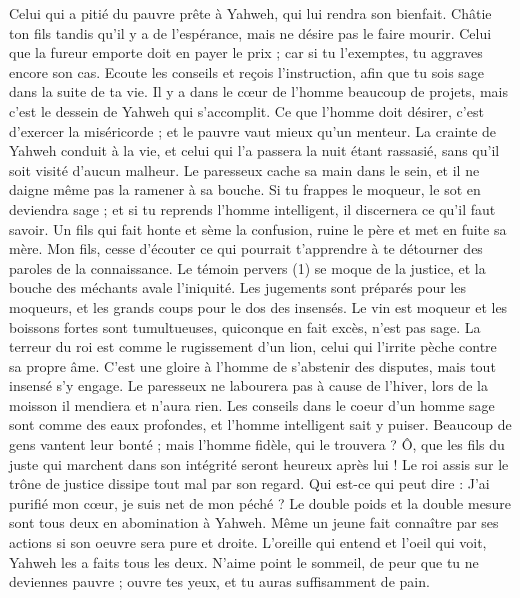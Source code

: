 \begin{multicols}{2}
Celui qui a pitié du pauvre prête à Yahweh, qui lui rendra son bienfait.
Châtie ton fils tandis qu'il y a de l'espérance, mais ne désire pas le faire mourir.
Celui que la fureur emporte doit en payer le prix ; car si tu l'exemptes, tu aggraves encore son cas.
Ecoute les conseils et reçois l'instruction, afin que tu sois sage dans la suite de ta vie.
Il y a dans le cœur de l’homme beaucoup de projets, mais c’est le dessein de Yahweh qui s’accomplit.
Ce que l'homme doit désirer, c'est d'exercer la miséricorde ; et le pauvre vaut mieux qu’un menteur.
La crainte de Yahweh conduit à la vie, et celui qui l'a passera la nuit étant rassasié, sans qu'il soit visité d'aucun malheur.
Le paresseux cache sa main dans le sein, et il ne daigne même pas la ramener à sa bouche.
Si tu frappes le moqueur, le sot en deviendra sage ; et si tu reprends l'homme intelligent, il discernera ce qu'il faut savoir.
Un fils qui fait honte et sème la confusion, ruine le père et met en fuite sa mère.
Mon fils, cesse d’écouter ce qui pourrait t’apprendre à te détourner des paroles de la connaissance.
Le témoin pervers (1) se moque de la justice, et la bouche des méchants avale l'iniquité.
Les jugements sont préparés pour les moqueurs, et les grands coups pour le dos des insensés.
\VerseOne{}Le vin est moqueur et les boissons fortes sont tumultueuses, quiconque en fait excès, n'est pas sage.
La terreur du roi est comme le rugissement d'un lion, celui qui l’irrite pèche contre sa propre âme.
C'est une gloire à l'homme de s'abstenir des disputes, mais tout insensé s'y engage.
Le paresseux ne labourera pas à cause de l’hiver, lors de la moisson il mendiera et n'aura rien.
Les conseils dans le coeur d'un homme sage sont comme des eaux profondes, et l'homme intelligent sait y puiser.
Beaucoup de gens vantent leur bonté ; mais l’homme fidèle, qui le trouvera ?
Ô, que les fils du juste qui marchent dans son intégrité seront heureux après lui !
Le roi assis sur le trône de justice dissipe tout mal par son regard.
Qui est-ce qui peut dire : J'ai purifié mon cœur, je suis net de mon péché ?
Le double poids et la double mesure sont tous deux en abomination à Yahweh.
Même un jeune fait connaître par ses actions si son oeuvre sera pure et droite.
L'oreille qui entend et l'oeil qui voit, Yahweh les a faits tous les deux.
N'aime point le sommeil, de peur que tu ne deviennes pauvre ; ouvre tes yeux, et tu auras suffisamment de pain.

\end{multicols}
